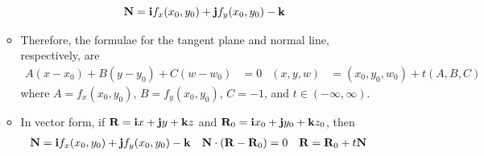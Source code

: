 \documentclass[../main.tex]{subfiles}
\begin{document}
\begin{itemize}
\begin{itemize}
\begin{equation*}
            \vb{N} = \vb{i}f_x(x_0,y_0)+\vb{j}f_y(x_0,y_0)-\vb{k}
        \end{equation*}
        \item Therefore, the formulae for the tangent plane and normal line, respectively, are
        \begin{align*}
            A(x-x_0)+B(y-y_0)+C(w-w_0) &= 0&
                (x,y,w) &= (x_0,y_0,w_0)+t(A,B,C)
        \end{align*}
        where $A=f_x(x_0,y_0)$, $B=f_y(x_0,y_0)$, $C=-1$, and $t\in(-\infty,\infty)$.
        \item In vector form, if $\vb{R}=\vb{i}x+\vb{j}y+\vb{k}z$ and $\vb{R}_0=\vb{i}x_0+\vb{j}y_0+\vb{k}z_0$, then
        \begin{align*}
            \vb{N} &= \vb{i}f_x(x_0,y_0)+\vb{j}f_y(x_0,y_0)-\vb{k}&
                \vb{N}\cdot(\vb{R}-\vb{R}_0) &= 0&
                    \vb{R} &= \vb{R}_0+t\vb{N}
        \end{align*}
    \end{itemize}
\end{itemize}
\end{document}

